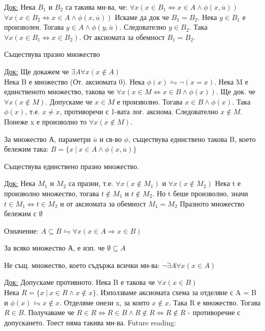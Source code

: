\documentclass[fleqn, titlepage, 12pt]{report}
\begin{document}
\underline{Док:} Нека $B_1$ и $B_2$ са такива мн-ва, че:
$\forall{x}(x \in B_1 \Leftrightarrow x \in A \land \phi (x, \overline{u}))$
$\forall{x}(x \in B_2 \Leftrightarrow x \in A \land \phi (x, \overline{u}))$
Искаме да док че $B_1 = B_2$. Нека $y \in B_1$ е произволен. Тогава $y \in A \land \phi (y, \overline{u})$.
Следователно $y \in B_2$. Така $\forall{x}(x \in B_1 \Leftrightarrow x \in B_2)$. От аксиомата за обемност $B_1 = B_2$.
\bigbreak

 Съществува празно множество
\bigbreak

\underline{Док:} Ще докажем че $\exists{A}\forall{x}(x \notin A)$ \\
Нека B е множество (От. аксиомата 0). Нека $\phi (x) \leftrightharpoons \lnot (x = x)$. Нека M е единственото множество, такова че
$\forall{x}(x \in M \Leftrightarrow x \in B \land \phi (x))$. Ще док. че $\forall{x}(x \notin M)$.
Допускаме че $x \in M$ е произволно. Тогава $x \in B \land \phi (x)$. Така $\phi (x)$, т.е. $x \neq x$,
противоречи с 1-вата лог. аксиома. Следователно $x \notin M$. Понеже x е произволно то $\forall{x}(x \notin M)$.
\bigbreak

 За множество А, параметри $\overline{u}$ и св-во $\phi$, съществува единствено такова B, което бележим така:
$B = \{x\ |\ x \in A \land \phi (x, \overline{u})\}$
\bigbreak

 Съществува единствено празно множество.
\bigbreak

\underline{Док:} Нека $M_1$ и $M_2$ са празни, т.е. $\forall{x}(x \notin M_1)$ и $\forall{x}(x \notin M_2)$
Нека t е произволно множество, тогава $t \notin M_1$ и $t \notin M_2$. Но t беше произволно,
значи $t \in M_1 \Leftrightarrow t \in M_2$ и от аксиомата за обемност $M_1 = M_2$
Празното множество бележим с $\emptyset$
\bigbreak

Означение: $A \subseteq B \leftrightharpoons \forall{x}(x \in A \Rightarrow x \in B)$
\bigbreak

 За всяко множество А, е изп. че $\emptyset \subseteq A$
\bigbreak

 Не същ. множество, което съдържа всички мн-ва: $\lnot \exists{A}\forall{x}(x \in A)$
\bigbreak

\underline{Док:} Допускаме противното. Нека B е такова че $\forall{x}(x \in B)$\\
Нека $R = \{x\ |\ x \in R \land x \notin x\}$. Използваме аксиомата схема за отделяне с A = B и
$\phi (x) \leftrightharpoons x \notin x$.
Отделяме онези x, за които $x \notin x$. Така R е множество. Тогава $R \in B$.
Получаваме че $R \in R \Leftrightarrow R \in B \land R \notin R \Leftrightarrow R \notin R$ - противоречие с допускането.
Тоест няма такива мн-ва.
\bigbreak Future reading:
\end{document}
